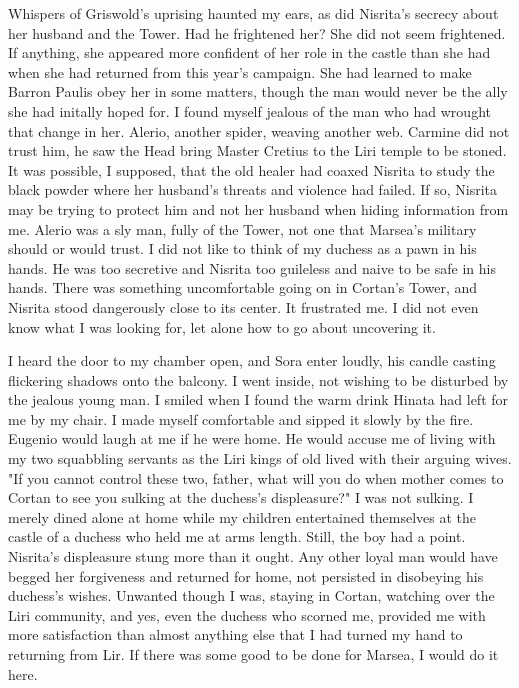 \documentclass{article}
\begin{document}
Whispers of Griswold's uprising haunted my ears, as did Nisrita's secrecy about her husband and the Tower. Had he frightened her? She did not seem frightened. If anything, she appeared more confident of her role in the castle than she had when she had returned from this year's campaign. She had learned to make Barron Paulis obey her in some matters, though the man would never be the ally she had initally hoped for. I found myself jealous of the man who had wrought that change in her. Alerio, another spider, weaving another web. Carmine did not trust him, he saw the Head bring Master Cretius to the Liri temple to be stoned. It was possible, I supposed, that the old healer had coaxed Nisrita to study the black powder where her husband's threats and violence had failed. If so, Nisrita may be trying to protect him and not her husband when hiding information from me. Alerio was a sly man, fully of the Tower, not one that Marsea's military should or would trust. I did not like to think of my duchess as a pawn in his hands. He was too secretive and Nisrita too guileless and naive to be safe in his hands. There was something uncomfortable going on in Cortan's Tower, and Nisrita stood dangerously close to its center. It frustrated me. I did not even know what I was looking for, let alone how to go about uncovering it. 

I heard the door to my chamber open, and Sora enter loudly, his candle casting flickering shadows onto the balcony. I went inside, not wishing to be disturbed by the jealous young man. I smiled when I found the warm drink Hinata had left for me by my chair. I made myself comfortable and sipped it slowly by the fire. Eugenio would laugh at me if he were home. He would accuse me of living with my two squabbling servants as the Liri kings of old lived with their arguing wives. "If you cannot control these two, father, what will you do when mother comes to Cortan to see you sulking at the duchess's displeasure?" I was not sulking. I merely dined alone at home while my children entertained themselves at the castle of a duchess who held me at arms length. Still, the boy had a point. Nisrita's displeasure stung more than it ought. Any other loyal man would have begged her forgiveness and returned for home, not persisted in disobeying his duchess's wishes. Unwanted though I was, staying in Cortan, watching over the Liri community, and yes, even the duchess who scorned me, provided me with more satisfaction than almost anything else that I had turned my hand to returning from Lir. If there was some good to be done for Marsea, I would do it here. 
\end{document}

